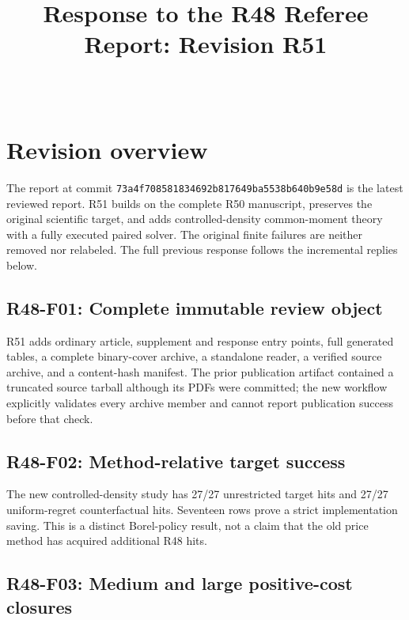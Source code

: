 



\begin{frontmatter}\title{Response to the R48 Referee Report: Revision R51}

\begin{aug}\author[id=au1,addressref={add1}]{~}\address[id=add1]{}\end{aug}\end{frontmatter}

\section{Revision overview}

The report at commit \texttt{73a4f708581834692b817649ba5538b640b9e58d} is the latest reviewed report. R51 builds on the complete R50 manuscript, preserves the original scientific target, and adds controlled-density common-moment theory with a fully executed paired solver. The original finite failures are neither removed nor relabeled. The full previous response follows the incremental replies below.

\subsection{R48-F01: Complete immutable review object}

R51 adds ordinary article, supplement and response entry points, full generated tables, a complete binary-cover archive, a standalone reader, a verified source archive, and a content-hash manifest. The prior publication artifact contained a truncated source tarball although its PDFs were committed; the new workflow explicitly validates every archive member and cannot report publication success before that check.

\subsection{R48-F02: Method-relative target success}

The new controlled-density study has 27/27 unrestricted target hits and 27/27 uniform-regret counterfactual hits. Seventeen rows prove a strict implementation saving. This is a distinct Borel-policy result, not a claim that the old price method has acquired additional R48 hits.

\subsection{R48-F03: Medium and large positive-cost closures}

